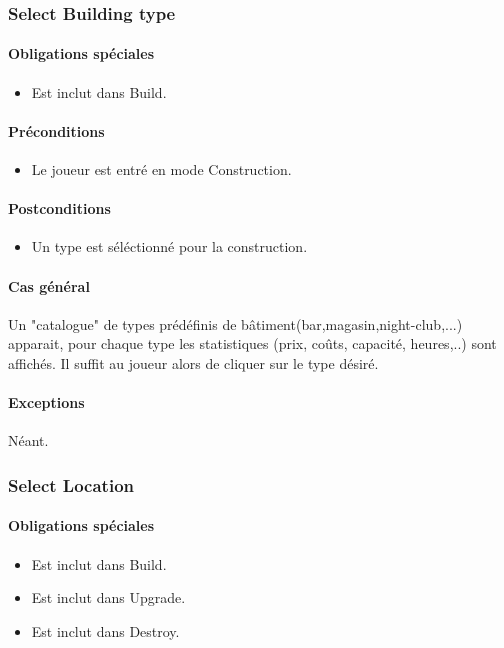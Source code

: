 \documentclass[a4paper,11pt]{report}
\begin{document}
\subsubsection{Select Building type}
\paragraph{Obligations spéciales}
\begin{itemize}
 \item Est inclut dans Build.
\end{itemize}
\paragraph{Préconditions}
\begin{itemize}
 \item Le joueur est entré en mode Construction.
\end{itemize}
\paragraph{Postconditions}
\begin{itemize}
 \item Un type est séléctionné pour la construction.
\end{itemize}
\paragraph{Cas général}
Un "catalogue" de types prédéfinis de bâtiment(bar,magasin,night-club,...) apparait, pour chaque type les statistiques (prix, coûts, capacité, heures,..) sont affichés. Il suffit au joueur alors de cliquer sur le type désiré.
\paragraph{Exceptions} Néant.

\newpage
\subsubsection{Select Location}
\paragraph{Obligations spéciales}
\begin{itemize}
 \item Est inclut dans Build.
 \item Est inclut dans Upgrade.
 \item Est inclut dans Destroy.
\end{itemize}
\end{document}
